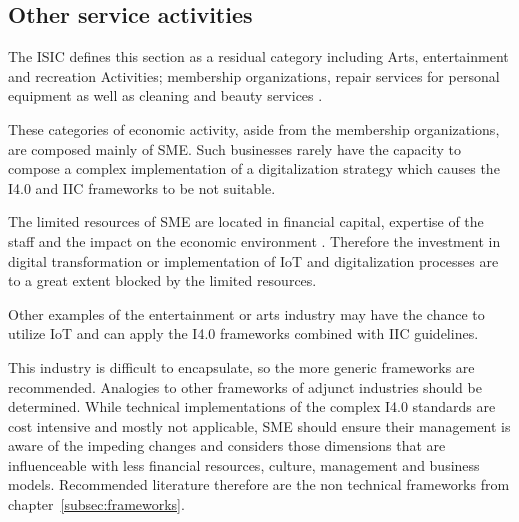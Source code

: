 
\subsection{Other service activities}
The \ac{ISIC} defines this section as a residual category including Arts, entertainment and recreation Activities; membership organizations, repair services for personal equipment as well as cleaning and beauty services \cite[p.262ff.]{ISIC:2008}.

These categories of economic activity, aside from the membership organizations, are composed mainly of \ac{SME}. Such businesses rarely have the capacity to compose a complex implementation of a digitalization strategy which causes the \ac{I4.0} and \ac{IIC} frameworks to be not suitable.

The limited resources of \ac{SME} are located in financial capital, expertise of the staff and the impact on the economic environment \cite{JSBM:JSBM341}. Therefore the investment in digital transformation or implementation of \ac{IoT} and digitalization processes are to a great extent blocked by the limited resources.

Other examples of the entertainment or arts industry may have the chance to utilize \ac{IoT} and can apply the \ac{I4.0} frameworks combined with \ac{IIC} guidelines.

This industry is difficult to encapsulate, so the more generic frameworks are recommended. Analogies to other frameworks of adjunct industries should be determined. While technical implementations of the complex \ac{I4.0} standards are cost intensive and mostly not applicable, \ac{SME} should ensure their management is aware of the impeding changes and considers those dimensions that are influenceable with less financial resources, culture, management and business models. Recommended literature therefore are the non technical frameworks from chapter~\ref{subsec:frameworks}. 
